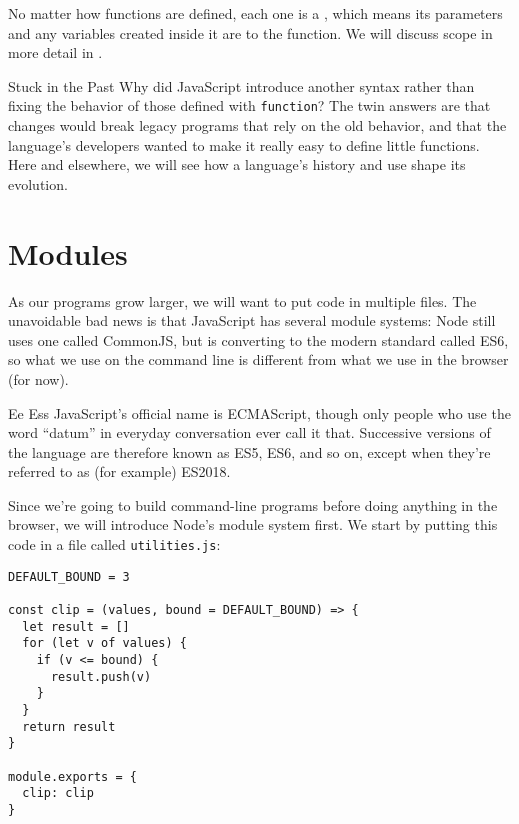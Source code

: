No matter how functions are defined,
each one is a ,
which means its parameters and any variables created inside it
are  to the function.
We will discuss scope in more detail in .

\begin{aside}{Stuck in the Past}
  Why did JavaScript introduce another syntax
  rather than fixing the behavior of those defined with \texttt{function}?
  The twin answers are that changes would break legacy programs that rely on the old behavior,
  and that the language's developers wanted to make it really easy to define little functions.
  Here and elsewhere,
  we will see how a language's history and use shape its evolution.
\end{aside}

\section{Modules}\label{s:basics-modules}

As our programs grow larger,
we will want to put code in multiple files.
The unavoidable bad news is that JavaScript has several module systems:
Node still uses one called CommonJS,
but is converting to the modern standard called ES6,
so what we use on the command line is different from what we use in the browser (for now).

\begin{aside}{Ee Ess}
  JavaScript's official name is ECMAScript,
  though only people who use the word ``datum'' in everyday conversation ever call it that.
  Successive versions of the language are therefore known as ES5, ES6, and so on,
  except when they're referred to as (for example) ES2018.
\end{aside}

Since we're going to build command-line programs before doing anything in the browser,
we will introduce Node's module system first.
We start by putting this code in a file called \texttt{utilities.js}:

\begin{verbatim}
DEFAULT_BOUND = 3

const clip = (values, bound = DEFAULT_BOUND) => {
  let result = []
  for (let v of values) {
    if (v <= bound) {
      result.push(v)
    }
  }
  return result
}

module.exports = {
  clip: clip
}
\end{verbatim}

